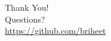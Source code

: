 \documentclass{beamer}
\begin{document}
\begin{frame}{}
  \begin{center}
    {\Huge Thank You!} \\
    \vspace{1cm}
    {\large Questions?} \\
    \vspace{0.5cm}
    \url{https://github.com/briheet}
  \end{center}
\end{frame}
\end{document}
